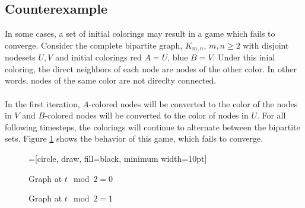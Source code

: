 \documentclass[letterpaper, 11pt]{article}
\begin{document}
\subsection{Counterexample}
In some cases, a set of initial colorings may result in a game which fails to converge. Consider the complete bipartite graph, $K_{m,n}$, $m,n \geq 2$ with disjoint nodesets $U, V$ and initial colorings red $A=U$, blue $B=V$. Under this inial coloring, the direct neighbors of each node are nodes of the other color. In other words, nodes of the same color are not direclty connected. 
\\\\
In the first iteration, $A$-colored nodes will be converted to the color of the nodes in $V$ and $B$-colored nodes will be converted to the color of nodes in $U$. For all following timesteps, the colorings will continue to alternate between the bipartite sets. Figure \ref{fig:converge} shows the behavior of this game, which fails to converge.

\begin{figure}[h!]   
\begin{center}
=[circle, draw, fill=black, minimum width=10pt]

\caption{Graph at $t\mod 2 = 0$}

\caption{Graph at $t\mod 2 = 1$}
\label{fig:converge}
\end{center}

\end{figure}
\end{document}

